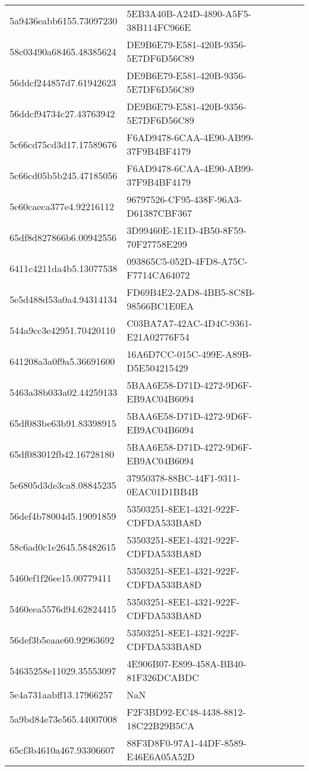 \begin{tabular}{ll}
5a9436eabb6155.73097230 & 5EB3A40B-A24D-4890-A5F5-38B114FC966E \\
58c03490a68465.48385624 & DE9B6E79-E581-420B-9356-5E7DF6D56C89 \\
56ddcf244857d7.61942623 & DE9B6E79-E581-420B-9356-5E7DF6D56C89 \\
56ddcf94734c27.43763942 & DE9B6E79-E581-420B-9356-5E7DF6D56C89 \\
5c66cd75cd3d17.17589676 & F6AD9478-6CAA-4E90-AB99-37F9B4BF4179 \\
5c66cd05b5b245.47185056 & F6AD9478-6CAA-4E90-AB99-37F9B4BF4179 \\
5e60caeca377e4.92216112 & 96797526-CF95-438F-96A3-D61387CBF367 \\
65df8d827866b6.00942556 & 3D99460E-1E1D-4B50-8F59-70F27758E299 \\
6411c4211da4b5.13077538 & 093865C5-052D-4FD8-A75C-F7714CA64072 \\
5e5d488d53a0a4.94314134 & FD69B4E2-2AD8-4BB5-8C8B-98566BC1E0EA \\
544a9cc3e42951.70420110 & C03BA7A7-42AC-4D4C-9361-E21A02776F54 \\
641208a3a0f9a5.36691600 & 16A6D7CC-015C-499E-A89B-D5E504215429 \\
5463a38b033a02.44259133 & 5BAA6E58-D71D-4272-9D6F-EB9AC04B6094 \\
65df083be63b91.83398915 & 5BAA6E58-D71D-4272-9D6F-EB9AC04B6094 \\
65df083012fb42.16728180 & 5BAA6E58-D71D-4272-9D6F-EB9AC04B6094 \\
5e6805d3de3ca8.08845235 & 37950378-88BC-44F1-9311-0EAC01D1BB4B \\
56def4b78004d5.19091859 & 53503251-8EE1-4321-922F-CDFDA533BA8D \\
58c6ad0c1e2645.58482615 & 53503251-8EE1-4321-922F-CDFDA533BA8D \\
5460ef1f26ee15.00779411 & 53503251-8EE1-4321-922F-CDFDA533BA8D \\
5460eea5576d94.62824415 & 53503251-8EE1-4321-922F-CDFDA533BA8D \\
56def3b5eaae60.92963692 & 53503251-8EE1-4321-922F-CDFDA533BA8D \\
54635258e11029.35553097 & 4E906B07-E899-458A-BB40-81F326DCABDC \\
5e4a731aabff13.17966257 & NaN \\
5a9bd84e73e565.44007008 & F2F3BD92-EC48-4438-8812-18C22B29B5CA \\
65cf3b4610a467.93306607 & 88F3D8F0-97A1-44DF-8589-E46E6A05A52D \\

\end{tabular}
